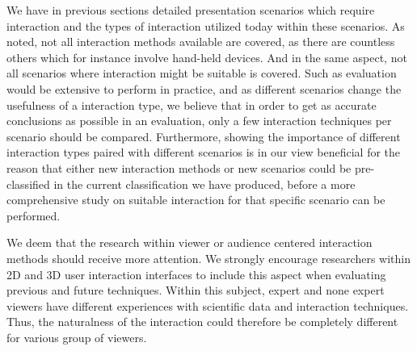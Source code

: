 \documentclass[review,journal]{vgtc}         %
\begin{document}
We have in previous sections detailed presentation scenarios which require interaction and the types of interaction utilized today within these scenarios.
As noted, not all interaction methods available are covered, as there are countless others which for instance involve hand-held devices.
And in the same aspect, not all scenarios where interaction might be suitable is covered.
Such as evaluation would be extensive to perform in practice, and as different scenarios change the usefulness of a interaction type, we believe that in order to get as accurate conclusions as possible in an evaluation, only a few interaction techniques per scenario should be compared.
Furthermore, showing the importance of different interaction types paired with different scenarios is in our view beneficial for the reason that either new interaction methods or new scenarios could be pre-classified in the current classification we have produced, before a more comprehensive study on suitable interaction for that specific scenario can be performed.

We deem that the research within viewer or audience centered interaction methods should receive more attention. 
We strongly encourage researchers within 2D and 3D user interaction interfaces to include this aspect when evaluating previous and future techniques.
Within this subject, expert and none expert viewers have different experiences with scientific data and interaction techniques. Thus, the naturalness of the interaction could therefore be completely different for various group of viewers.


\end{document}
